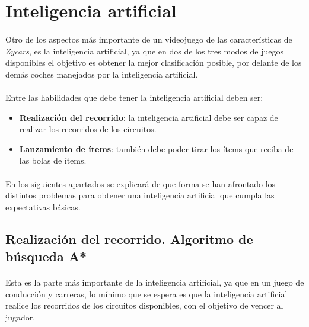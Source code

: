 \section{Inteligencia artificial}

\paragraph{}
Otro de los aspectos más importante de un videojuego de las características de \emph{Zycars}, es la inteligencia artificial,
ya que en dos de los tres modos de juegos disponibles el objetivo es obtener la mejor clasificación posible, por delante
de los demás coches manejados por la inteligencia artificial.

\paragraph{}
Entre las habilidades que debe tener la inteligencia artificial deben ser:

\begin{itemize}
    \item \textbf{Realización del recorrido}: la inteligencia artificial debe ser capaz de realizar los recorridos de los
    circuitos.
    
    \item \textbf{Lanzamiento de ítems}: también debe poder tirar los ítems que
    reciba de las bolas de ítems.
\end{itemize}

\paragraph{}
En los siguientes apartados se explicará de que forma se han afrontado los distintos problemas para obtener una inteligencia
artificial que cumpla las expectativas básicas.

\subsection{Realización del recorrido. Algoritmo de búsqueda A*}

\paragraph{}
Esta es la parte más importante de la inteligencia artificial, ya que en un juego de conducción y carreras, lo mínimo que se 
espera es que la inteligencia artificial realice los recorridos de los circuitos disponibles, con el objetivo de vencer al
jugador.

